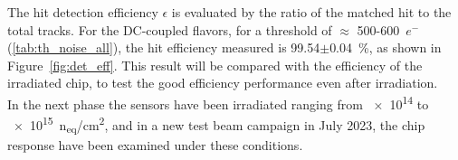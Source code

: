 \begin{figure}[h!]
\centering
{}\quad
{}
\end{figure}

\begin{comment}
\begin{figure}
\centering
\texttt{[image: cluster\_dist]}
\caption{Cluster charge distribution.}
\label{fig:clust_dist}
\end{figure}
\end{comment}


The hit detection efficiency $\epsilon$ is evaluated by the ratio of the matched hit to the total tracks. For the DC-coupled flavors, for a threshold of $\approx$  500-600~$e^{-}$ (\autoref{tab:th_noise_all}), the hit efficiency measured is 99.54$\pm$0.04~\%, as shown in Figure~\autoref{fig:det_eff}. This result will be compared with the efficiency of the irradiated chip, to test the  good efficiency performance even after irradiation.\\

In the next phase the sensors have been irradiated ranging from \num{e14} to \SI{e15}{n_{eq}/cm^{2}}, and in a new test beam campaign in July 2023, the chip response have been examined under these conditions.



\begin{comment}
\begin{figure}
\centering
\texttt{[image: det\_eff\_DC]}
\caption{(99.54$\pm$0.04)~\% hit detection efficiency of DC-coupled flavours at \SI{3}{V} bias voltage.}
\label{fig:det_eff}
\end{figure}
\end{comment}




